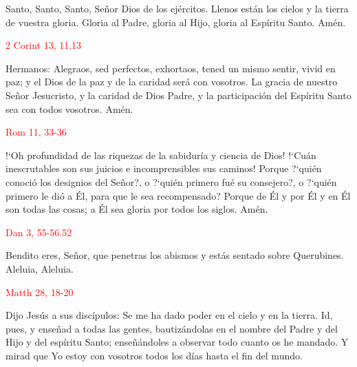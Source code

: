 \documentclass[10pt]{article}
\begin{document}
\begin{multicols}{2}
      Santo, Santo, Santo, Señor Dios de los ejércitos. Llenos están los cielos y la tierra de vuestra gloria. Gloria al Padre, gloria al Hijo, gloria al Espíritu Santo. Amén.\newline

      \hfill\textcolor{red}{2 Corint 13, 11.13}

      Hermanos: Alegraos, sed perfectos, exhortaos, tened un mismo sentir, vivid en paz; y el Dios de la paz y de la caridad será con vosotros. La gracia de nuestro Señor Jesucristo,
      y la caridad de Dios Padre, y la participación del Espíritu Santo sea con todos vosotros. Amén.\newline

      \hfill\textcolor{red}{Rom 11, 33-36}

      {!`}Oh profundidad de las riquezas de la sabiduría y ciencia de Dios! {!`}Cuán inescrutables son sus juicios e incomprensibles sus caminos! Porque {?`}quién conoció los designios del Señor?,
      o {?`}quién primero fué su consejero?, o {?`}quién primero le dió a Él, para que le sea recompensado? Porque de Él y por Él y en Él son todas las cosas; a Él sea gloria por todos los siglos.
      Amén.\newline

      \hfill\textcolor{red}{Dan 3, 55-56.52}

      Bendito eres, Señor, que penetras los abismos y estás sentado sobre Querubines.
      Aleluia, Aleluia.\newline

      \hfill\textcolor{red}{Matth 28, 18-20}

      Dijo Jesús a sus discípulos: Se me ha dado poder en el cielo y en la tierra. Id, pues, y enseñad a todas las gentes, bautizándolas en el nombre del Padre y del Hijo y del espíritu
      Santo; enseñándoles a observar todo cuanto os he mandado. Y mirad que Yo estoy con vosotros todos los días hasta el fin del mundo.\newline

      \begin{otherlanguage}{latin}
            

            

            
      \end{otherlanguage}
      \newline


\end{multicols}
\end{document}
